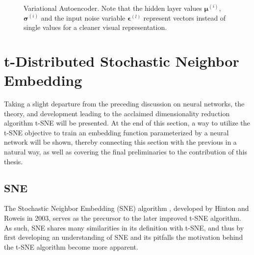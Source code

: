 

\begin{figure}[!htb]
  \centering
  \resizebox{\textwidth}{!}{\unskip}
  \caption{Variational Autoencoder. Note that the hidden layer values $\mathbf{\mu}^{(i)}$, $\mathbf{\sigma}^{(i)}$ and the input noise variable $\mathbf{\epsilon}^{(l)}$ represent vectors instead of single values for a cleaner visual representation.}
  \label{fig:vae}
\end{figure}

\section{t-Distributed Stochastic Neighbor Embedding}
\label{section:tsne}

Taking a slight departure from the preceding discussion on neural networks, the theory, and development leading to the acclaimed dimensionality reduction algorithm t-SNE will be presented. At the end of this section, a way to utilize the t-SNE objective to train an embedding function parameterized by a neural network will be shown, thereby connecting this section with the previous in a natural way, as well as covering the final preliminaries to the contribution of this thesis.

\subsection{SNE}
\label{subsection:sne}

The Stochastic Neighbor Embedding (SNE) algorithm \cite{sne}, developed by Hinton and Roweis in 2003, serves as the precursor to the later improved t-SNE algorithm. As such, SNE shares many similarities in its definition with t-SNE, and thus by first developing an understanding of SNE and its pitfalls the motivation behind the t-SNE algorithm become more apparent.

